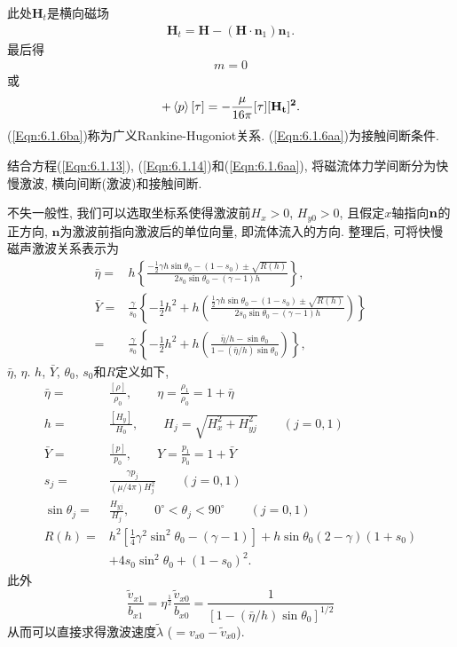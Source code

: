 \documentclass[10.5pt
]{article}
\begin{document}
此处$\boldsymbol{H}_t$是横向磁场
\begin{eqnarray*}
\boldsymbol{H}_t = \boldsymbol{H} - (\boldsymbol{H} \cdot \boldsymbol{n}_1) \boldsymbol{n}_1.
\end{eqnarray*}
最后得
\begin{align}
m = 0\label{Eqn:6.1.6aa}
\end{align}
或
\begin{align}
[e] + \left<p\right>[\tau] = -\frac{\mu}{16\pi} [\tau][\bf H_t]^2.\label{Eqn:6.1.6ba}
\end{align}
(\ref{Eqn:6.1.6ba})称为广义Rankine-Hugoniot关系. (\ref{Eqn:6.1.6aa})为接触间断条件.

结合方程(\ref{Eqn:6.1.13}), (\ref{Eqn:6.1.14})和(\ref{Eqn:6.1.6aa}),
将磁流体力学间断分为快慢激波, 横向间断(激波)和接触间断.

不失一般性, 我们可以选取坐标系使得激波前$H_x > 0$, $H_{y0} > 0$, 且假定$x$轴指向$\bf
n$的正方向, $\boldsymbol{n}$为激波前指向激波后的单位向量, 即流体流入的方向. 整理后, 可将快慢磁声激波关系表示为
\begin{align}
\bar{\eta} =& h\left\{\frac{-\frac{1}{2}\gamma h \sin\theta_0 -
(1-s_0) \pm
\sqrt{R(h)}}{2 s_0 \sin\theta_0 - (\gamma-1) h}\right\},\label{Eqn:6.2.15}
\\
\bar{Y} =& \frac{\gamma}{s_0} \left\{-\frac{1}{2} h^2 +
h\left(\frac{\frac{1}{2}\gamma h \sin\theta_0 - (1-s_0) \pm
\sqrt{R(h)}}{2 s_0 \sin\theta_0 - (\gamma-1) h}\right)\right\}\label{Eqn:6.2.16a}
\\
=& \frac{\gamma}{s_0} \left\{-\frac{1}{2} h^2 +
h\left(\frac{\bar{\eta}/h - \sin\theta_0}{1 - (\bar{\eta}/h)
\sin\theta_0}\right)\right\},\label{Eqn:6.2.16b}
\end{align}
$\bar{\eta}$, $\eta$. $h$, $\bar{Y}$, $\theta_0$, $s_0$和$R$定义如下,
\begin{align}
\bar{\eta} =& \frac{[\rho]}{\rho_0}, \qquad \eta = \frac{\rho_1}{\rho_0} = 1 + \bar{\eta} \nonumber\\
h =& \frac{[H_y]}{H_0}, \qquad H_j = \sqrt{H_x^2+H_{yj}^2} \qquad (j=0,1) \nonumber\\
\bar{Y} =& \frac{[p]}{p_0}, \qquad Y = \frac{p_1}{p_0} = 1 + \bar{Y} \nonumber\\
s_j =& \frac{\gamma p_j}{(\mu/4\pi)H_j^2} \qquad (j=0,1) \nonumber\\
\sin\theta_j =& \frac{H_{yj}}{H_j}, \qquad 0^\circ < \theta_j < 90^\circ \qquad (j=0,1) \nonumber\\
R(h) =& h^2[\frac{1}{4} \gamma^2 \sin^2\theta_0 - (\gamma-1)] + h\sin\theta_0
(2-\gamma)(1+s_0)
\nonumber\\
& + 4s_0 \sin^2\theta_0 + (1-s_0)^2.\label{Eqn:6.2.17}
\end{align}
此外
\begin{equation}
\frac{\tilde{v}_{x1}}{b_{x1}} = \eta^{\frac{1}{2}} \frac{\tilde{v}_{x0}}{b_{x0}} =
\frac{1}{[1-(\bar{\eta}/h) \sin\theta_0]^{1/2}}
\end{equation}
从而可以直接求得激波速度$\tilde{\lambda}$ ($=v_{x0}-\tilde{v}_{x0}$).
\end{document}
